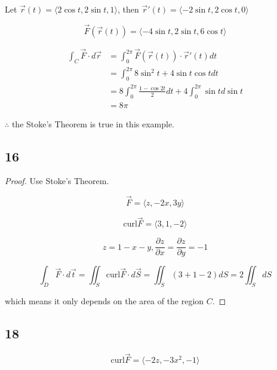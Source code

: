 \documentclass{article}
\begin{document}
  Let $\overrightarrow {r}(t) = \langle 2 \cos t, 2 \sin t, 1 \rangle$, then $\overrightarrow{r}'(t) = \langle -2 \sin t, 2 \cos t, 0 \rangle$

  $$\overrightarrow{F}(\overrightarrow{r}(t)) = \langle -4 \sin t, 2 \sin t, 6 \cos t \rangle$$

  $$\begin{aligned}
    \int_C \overrightarrow{F} \cdot d \overrightarrow{r} &= \int_0^{2\pi} \overrightarrow{F}(\overrightarrow{r}(t)) \cdot \overrightarrow{r}'(t) dt \\
                                                         &= \int_0^{2\pi} 8 \sin^2 t + 4 \sin t \cos t dt \\
                                                         &= 8 \int_0^{2\pi} \frac{1 - \cos 2t}{2} dt + 4\int_0^{2\pi} \sin t d\sin t \\
                                                         &=  8\pi
  \end{aligned}
  $$

  $\therefore$ the Stoke's Theorem is true in this example.

  \subsection*{16}

  \begin{proof}

    Use Stoke's Theorem.

    $$\overrightarrow{F} = \langle z, -2x, 3y \rangle$$

    $$\textrm{curl} \overrightarrow{F} = \langle 3, 1, -2 \rangle$$

    $$z = 1 - x - y, \frac{\partial z}{\partial x} = \frac{\partial z}{\partial y} = -1$$

    $$\int_D \overrightarrow{F} \cdot d \overrightarrow{t} = \iint_S \textrm{curl} \overrightarrow{F} \cdot d \overrightarrow{S} = \iint_S (3 + 1 - 2) dS = 2\iint_S dS$$

    which means it only depends on the area of the region $C$.
    
  \end{proof}

  \subsection*{18}

  $$\textrm{curl} \overrightarrow F = \langle - 2z, - 3x^2, -1 \rangle$$
\end{document}
